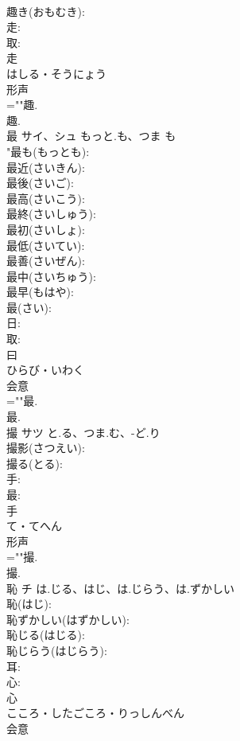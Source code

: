 \documentclass[8pt]{extreport}
\begin{document}
\begin{CJK}{UTF8}{min}
\\	趣き(おもむき): 
\\	走: 
\\	取: 
\\	走	
\\	はしる・そうにょう	
\\	形声 
\\	=""趣.
\\	趣.
\\	最	サイ、シュ	もっと.も、つま	も	
\\	"最も(もっとも): 
\\	最近(さいきん): 
\\	最後(さいご): 
\\	最高(さいこう): 
\\	最終(さいしゅう): 
\\	最初(さいしょ): 
\\	最低(さいてい): 
\\	最善(さいぜん): 
\\	最中(さいちゅう): 
\\	最早(もはや): 
\\	最(さい): 
\\	日: 
\\	取: 
\\	曰	
\\	ひらび・いわく	
\\	会意 
\\	=""最.
\\	最.
\\	撮	サツ	と.る、つま.む、-ど.り		
\\	撮影(さつえい): 
\\	撮る(とる): 
\\	手: 
\\	最: 
\\	手	
\\	て・てへん	
\\	形声 
\\	=""撮.
\\	撮.
\\	恥	チ	は.じる、はじ、は.じらう、は.ずかしい		
\\	恥(はじ): 
\\	恥ずかしい(はずかしい): 
\\	恥じる(はじる): 
\\	恥じらう(はじらう): 
\\	耳: 
\\	心: 
\\	心	
\\	こころ・したごころ・りっしんべん	
\\	会意 

\end{CJK}
\end{document}
